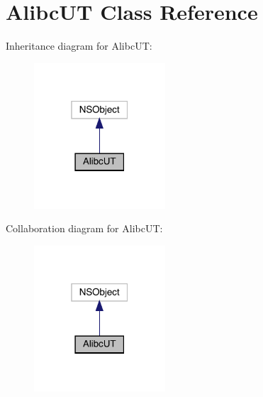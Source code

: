 \hypertarget{interface_alibc_u_t}{}\section{Alibc\+UT Class Reference}
\label{interface_alibc_u_t}


Inheritance diagram for Alibc\+UT\+:\nopagebreak
\begin{figure}[H]
\begin{center}
\leavevmode
\includegraphics[width=139pt]{interface_alibc_u_t__inherit__graph}
\end{center}
\end{figure}


Collaboration diagram for Alibc\+UT\+:\nopagebreak
\begin{figure}[H]
\begin{center}
\leavevmode
\includegraphics[width=139pt]{interface_alibc_u_t__coll__graph}
\end{center}
\end{figure}
